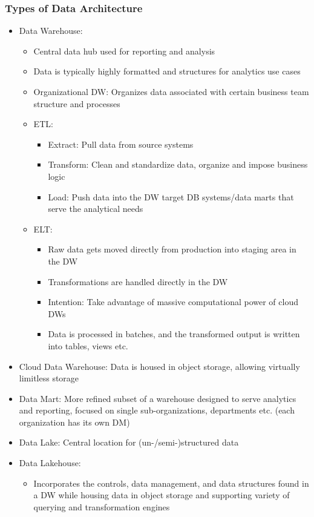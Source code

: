 \documentclass[11pt]{scrartcl}
\begin{document}
\subsubsection*{Types of Data Architecture}
\begin{itemize}
	\item Data Warehouse:
	\begin{itemize}
		\item Central data hub used for reporting and analysis
		\item Data is typically highly formatted and structures for analytics use cases
		\item Organizational DW: Organizes data associated with certain business team structure and processes
		\item ETL:
		\begin{itemize}
			\item Extract: Pull data from source systems
			\item Transform: Clean and standardize data, organize and impose business logic
			\item Load: Push data into the DW target DB systems/data marts that serve the analytical needs
		\end{itemize}
		\item ELT:
		\begin{itemize}
			\item Raw data gets moved directly from production into staging area in the DW
			\item Transformations are handled directly in the DW
			\item Intention: Take advantage of massive computational power of cloud DWs
			\item Data is processed in batches, and the transformed output is written into tables, views etc.
		\end{itemize}
	\end{itemize}
	\item Cloud Data Warehouse: Data is housed in object storage, allowing virtually limitless storage
	\item Data Mart: More refined subset of a warehouse designed to serve analytics and reporting, focused on single sub-organizations, departments etc. (each organization has its own DM)
	\item Data Lake: Central location for (un-/semi-)structured data
	\item Data Lakehouse: 
	\begin{itemize}
		\item Incorporates the controls, data management, and data structures found in a DW while housing data in object storage and supporting variety of querying and transformation engines

\end{itemize}
\end{itemize}
\end{document}
